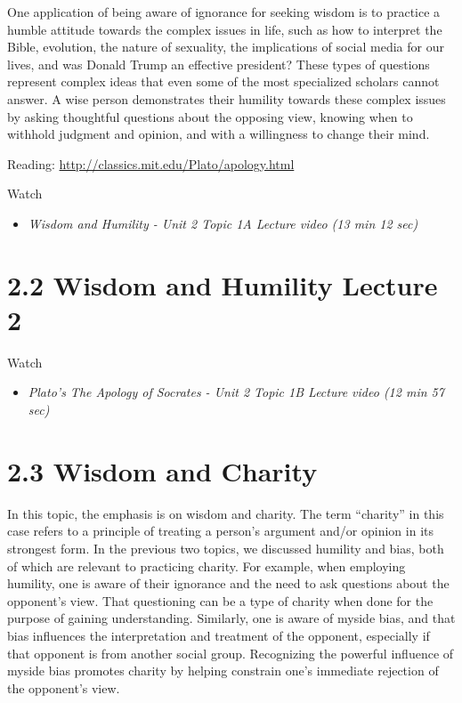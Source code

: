\documentclass[
]{book}
\providecommand{\tightlist}{%
  \setlength{\itemsep}{0pt}\setlength{\parskip}{0pt}}
\begin{document}
One application of being aware of ignorance for seeking wisdom is to practice a humble attitude towards the complex issues in life, such as how to interpret the Bible, evolution, the nature of sexuality, the implications of social media for our lives, and was Donald Trump an effective president? These types of questions represent complex ideas that even some of the most specialized scholars cannot answer. A wise person demonstrates their humility towards these complex issues by asking thoughtful questions about the opposing view, knowing when to withhold judgment and opinion, and with a willingness to change their mind.

Reading: \url{http://classics.mit.edu/Plato/apology.html}

Watch

\begin{itemize}
\tightlist
\item
  \emph{Wisdom and Humility - Unit 2 Topic 1A Lecture video (13 min 12 sec)}
\end{itemize}

\hypertarget{wisdom-and-humility-lecture-2}{%
\section*{2.2 Wisdom and Humility Lecture 2}\label{wisdom-and-humility-lecture-2}}

Watch

\begin{itemize}
\tightlist
\item
  \emph{Plato's The Apology of Socrates - Unit 2 Topic 1B Lecture video (12 min 57 sec)}
\end{itemize}

\hypertarget{wisdom-and-charity}{%
\section*{2.3 Wisdom and Charity}\label{wisdom-and-charity}}

In this topic, the emphasis is on wisdom and charity. The term ``charity'' in this case refers to a principle of treating a person's argument and/or opinion in its strongest form. In the previous two topics, we discussed humility and bias, both of which are relevant to practicing charity. For example, when employing humility, one is aware of their ignorance and the need to ask questions about the opponent's view. That questioning can be a type of charity when done for the purpose of gaining understanding. Similarly, one is aware of myside bias, and that bias influences the interpretation and treatment of the opponent, especially if that opponent is from another social group. Recognizing the powerful influence of myside bias promotes charity by helping constrain one's immediate rejection of the opponent's view.
\end{document}
